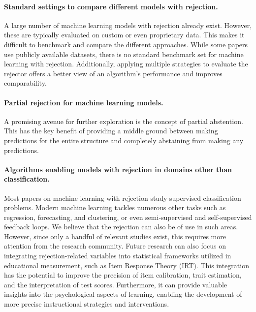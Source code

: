 \paragraph{Standard settings to compare different models with rejection.}
A large number of machine learning models with rejection already exist. However, these are typically evaluated on custom or even proprietary data. This makes it difficult to benchmark and compare the different approaches. While some papers use publicly available datasets, there is no standard benchmark set for machine learning with rejection.
Additionally, applying multiple strategies to evaluate the rejector offers a better view of an algorithm's performance and improves comparability.

\paragraph{Partial rejection for machine learning models.}
A promising avenue for further exploration is the concept of partial abstention. 
This has the key benefit of providing a middle ground between making predictions for the entire structure and completely abstaining from making any predictions.


\paragraph{Algorithms enabling models with rejection in domains other than classification.}
Most papers on machine learning with rejection study supervised classification problems. Modern machine learning tackles numerous other tasks such as regression, forecasting, and clustering, or even semi-supervised and self-supervised feedback loops. We believe that the rejection can also be of use in such areas. However, since only a handful of relevant studies exist, this requires more attention from the research community. 
Future research can also focus on integrating rejection-related variables into statistical frameworks utilized in educational measurement, such as Item Response Theory (IRT). This integration has the potential to improve the precision of item calibration, trait estimation, and the interpretation of test scores. Furthermore, it can provide valuable insights into the psychological aspects of learning, enabling the development of more precise instructional strategies and interventions.
